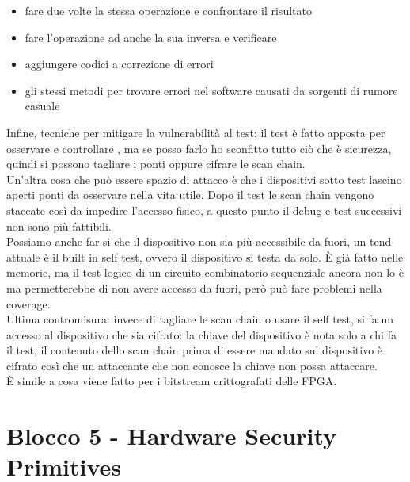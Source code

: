 \documentclass[oneside, 12pt]{extbook}
\begin{document}
\begin{itemize}
	\item fare due volte la stessa operazione e confrontare il risultato
	\item fare l'operazione ad anche la sua inversa e verificare
	\item aggiungere codici a correzione di errori
	\item gli stessi metodi per trovare errori nel software causati da sorgenti di rumore casuale
\end{itemize}
Infine, tecniche per mitigare la vulnerabilità al test: il test è fatto apposta per osservare e controllare , ma se posso farlo ho sconfitto tutto ciò che è sicurezza, quindi si possono tagliare i ponti oppure cifrare le scan chain.
\\Un'altra cosa che può essere spazio di attacco è che i dispositivi sotto test lascino aperti ponti da osservare nella vita utile. Dopo il test le scan chain vengono staccate così da impedire l'accesso fisico, a questo punto il debug e test successivi non sono più fattibili.
\\Possiamo anche far si che il dispositivo non sia più accessibile da fuori, un tend attuale è il built in self test, ovvero il dispositivo si testa da solo. È già fatto nelle memorie, ma il test logico di un circuito combinatorio sequenziale ancora non lo è ma permetterebbe di non avere accesso da fuori, però può fare problemi nella coverage.
\\Ultima contromisura: invece di tagliare le scan chain o usare il self test, si fa un accesso al dispositivo che sia cifrato: la chiave del dispositivo è nota solo a chi fa il test, il contenuto dello scan chain prima di essere mandato sul dispositivo è cifrato così che un attaccante che non conosce la chiave non possa attaccare.
\\È simile a cosa viene fatto per i bitstream crittografati delle FPGA.


\chapter{Blocco 5 - Hardware Security Primitives}
\end{document}
